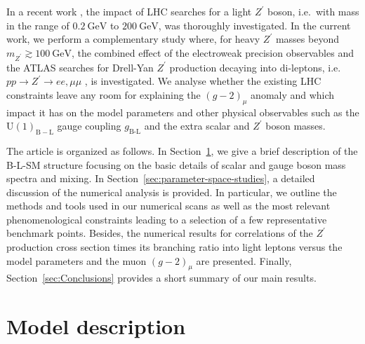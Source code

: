 \documentclass[a4paper,11pt]{article}
\renewcommand{\(}{\left(}
\renewcommand{\)}{\right)}
\renewcommand{\[}{\left[}
\renewcommand{\]}{\right]}
\newcommand{\U}[1]{\mathrm{U}(1)_{\mathrm{#1}}}			%
\newcommand{\ro}[1]{\textrm{#1}}
\begin{document}
In a recent work \cite{Deppisch:2019ldi}, the impact of LHC searches for a light $Z^\prime$ boson, i.e.~with mass in the range of $0.2~\ro{GeV}$ to $200~\ro{GeV}$, was thoroughly investigated. In the current work, we perform a complementary study where, for heavy $Z^\prime$ masses beyond $m_{Z^\prime} \gtrsim 100~\ro{GeV}$, the combined effect of the electroweak precision observables and the ATLAS searches for Drell-Yan $Z^\prime$ production decaying into di-leptons, i.e.~$pp \to Z^\prime \to ee,\mu \mu$ \cite{Aaboud:2017buh}, is investigated. We analyse whether the existing LHC constraints leave any room for explaining the $\(g-2\)_\mu$ anomaly and which impact it has on the model parameters and other physical observables such as the $\U{B-L}$ gauge coupling $g_\ro{B-L}$ and the extra scalar and $Z^\prime$ boson masses.

The article is organized as follows. In Section~\ref{sec:BLSM}, we give a brief description of the B-L-SM structure focusing on the basic details of scalar and gauge boson mass spectra and mixing. In Section~\ref{sec:parameter-space-studies}, a detailed discussion of the numerical analysis is provided. In particular, we outline the methods and tools used in our numerical scans as well as the most relevant phenomenological constraints leading to a selection of a few representative benchmark points. Besides, the numerical results for correlations of the $Z^\prime$ production cross section times its branching ratio into light leptons versus the model parameters and the muon $(g-2)_\mu$ are presented. Finally, Section~\ref{sec:Conclusions} provides a short summary of our main results.

\section{Model description}
\label{sec:BLSM}
\end{document}
